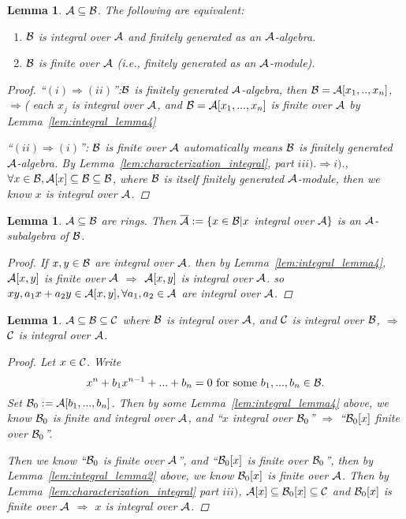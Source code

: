 \documentclass[11pt]{article}
\newtheorem{lemma}[thm]{Lemma}
\newcommand{\cala}{{\cal A}}
\newcommand{\calb}{{\cal B}}
\newcommand{\calc}{{\cal C}}
\newcommand{\Lrta}{\Longrightarrow}
\begin{document}
\begin{lemma}\label{lem:integral_lemma5}
$\cala\subseteq \calb$. The following are equivalent:
\begin{enumerate}[label=(\roman*)]
\item $\calb$ is integral over $\cala$ and finitely generated as an $\cala$-algebra.
\item $\calb$ is finite over $\cala$ (i.e., finitely generated as an $\cala$-module).
\end{enumerate}
\begin{proof}
``$(i)\Lrta(ii)$'':$\calb$ is finitely generated $\cala$-algebra, then $\calb=\cala[x_1,..,x_n]$, $\Lrta$( each $x_j$ is integral over $\cala$, and $\calb=\cala[x_1,...,x_n]$ is finite over $\cala$ by Lemma~\ref{lem:integral_lemma4}

``$(ii)\Lrta(i)$'': $\calb$ is finite over $\cala$ automatically means $\calb$ is finitely generated $\cala$-algebra. By Lemma~\ref{lem:characterization_integral}, part $iii).\Lrta i).$, $\forall x\in\calb, \cala[x]\subseteq \calb\subseteq\calb$, where $\calb$ is itself finitely generated $\cala$-module, then we know $x$ is integral over $\cala$.
\end{proof}
\end{lemma}

\begin{lemma}\label{lem:integral_lemma6}
$\cala\subseteq \calb$ are rings. Then $\overline{\cala}:=\{x\in \calb|x$ integral over $\cala\}$ is an $\cala$-subalgebra of $\calb$.
\begin{proof}
If $x,y\in \calb$ are integral over $\cala$. then by Lemma~\ref{lem:integral_lemma4}, $\cala[x,y]$ is finite over $\cala$ $\Lrta$ $\cala[x,y]$ is integral over $\cala$.
so $xy,a_1x+a_2y\in\cala[x,y],\forall a_1,a_2\in\cala$ are integral over $\cala$.
\end{proof}
\end{lemma}

\begin{lemma}\label{lem:integral_lemma7}
$\cala\subseteq \calb\subseteq\calc$ where $\calb$ is integral over $\cala$, and $\calc$ is integral over $\calb$, $\Lrta$ $\calc$ is integral over $\cala$.
\begin{proof}
Let $x\in\calc$. Write
$$
x^n+b_1x^{n-1}+...+b_n=0 \text{  for some $b_1,...,b_{n}\in\calb$}.
$$
Set $\calb_0:=\cala[b_1,...,b_n]$. Then by some Lemma~\ref{lem:integral_lemma4} above, we know $\calb_0$ is finite and integral over $\cala$, and ``$x$ integral over $\calb_0$'' $\Lrta$ ``$\calb_0[x]$ finite over $\calb_0$''.

Then we know  ``$\calb_0$ is finite over $\cala$'', and ``$\calb_0[x]$ is finite over $\calb_0$'', then by Lemma~\ref{lem:integral_lemma2} above, we know $\calb_0[x]$ is finite over $\cala$. Then by Lemma~\ref{lem:characterization_integral} part $iii)$, $\cala[x]\subseteq \calb_0[x]\subseteq\calc$ and $\calb_0[x]$ is finite over $\cala$ $\Lrta$ $x$ is integral over $\cala$.
\end{proof} 
\end{lemma}
\end{document}
